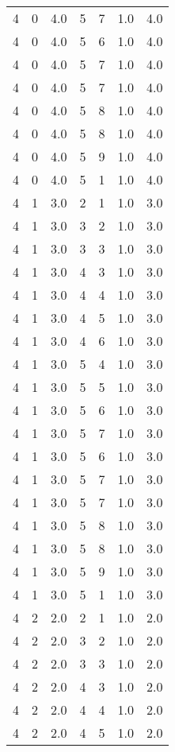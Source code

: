 \documentclass[a4paper,12pt]{article}
\begin{document}
\begin{center}
\begin{longtable}{ c c c | c c c | c }
        4 & 0 & 4.0 & 5 & 7 & 1.0 & 4.0 \\
        4 & 0 & 4.0 & 5 & 6 & 1.0 & 4.0 \\
        4 & 0 & 4.0 & 5 & 7 & 1.0 & 4.0 \\
        4 & 0 & 4.0 & 5 & 7 & 1.0 & 4.0 \\
        4 & 0 & 4.0 & 5 & 8 & 1.0 & 4.0 \\
        4 & 0 & 4.0 & 5 & 8 & 1.0 & 4.0 \\
        4 & 0 & 4.0 & 5 & 9 & 1.0 & 4.0 \\
        4 & 0 & 4.0 & 5 & 1 & 1.0 & 4.0 \\
        4 & 1 & 3.0 & 2 & 1 & 1.0 & 3.0 \\
        4 & 1 & 3.0 & 3 & 2 & 1.0 & 3.0 \\
        4 & 1 & 3.0 & 3 & 3 & 1.0 & 3.0 \\
        4 & 1 & 3.0 & 4 & 3 & 1.0 & 3.0 \\
        4 & 1 & 3.0 & 4 & 4 & 1.0 & 3.0 \\
        4 & 1 & 3.0 & 4 & 5 & 1.0 & 3.0 \\
        4 & 1 & 3.0 & 4 & 6 & 1.0 & 3.0 \\
        4 & 1 & 3.0 & 5 & 4 & 1.0 & 3.0 \\
        4 & 1 & 3.0 & 5 & 5 & 1.0 & 3.0 \\
        4 & 1 & 3.0 & 5 & 6 & 1.0 & 3.0 \\
        4 & 1 & 3.0 & 5 & 7 & 1.0 & 3.0 \\
        4 & 1 & 3.0 & 5 & 6 & 1.0 & 3.0 \\
        4 & 1 & 3.0 & 5 & 7 & 1.0 & 3.0 \\
        4 & 1 & 3.0 & 5 & 7 & 1.0 & 3.0 \\
        4 & 1 & 3.0 & 5 & 8 & 1.0 & 3.0 \\
        4 & 1 & 3.0 & 5 & 8 & 1.0 & 3.0 \\
        4 & 1 & 3.0 & 5 & 9 & 1.0 & 3.0 \\
        4 & 1 & 3.0 & 5 & 1 & 1.0 & 3.0 \\
        4 & 2 & 2.0 & 2 & 1 & 1.0 & 2.0 \\
        4 & 2 & 2.0 & 3 & 2 & 1.0 & 2.0 \\
        4 & 2 & 2.0 & 3 & 3 & 1.0 & 2.0 \\
        4 & 2 & 2.0 & 4 & 3 & 1.0 & 2.0 \\
        4 & 2 & 2.0 & 4 & 4 & 1.0 & 2.0 \\
        4 & 2 & 2.0 & 4 & 5 & 1.0 & 2.0 \\

\end{longtable}
\end{center}
\end{document}
